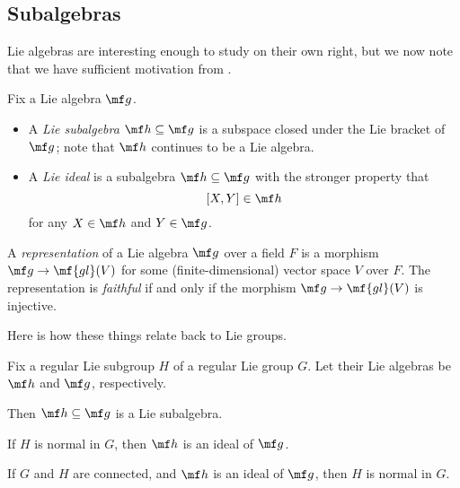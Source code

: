 \documentclass[../notes.tex]{subfiles}
\begin{document}
\subsection{Subalgebras}
Lie algebras are interesting enough to study on their own right, but we now note that we have sufficient motivation from .
\begin{defihelper}  
	Fix a Lie algebra $\mf g$.
	\begin{itemize}
		\item A \textit{Lie subalgebra} $\mf h\subseteq\mf g$ is a subspace closed under the Lie bracket of $\mf g$; note that $\mf h$ continues to be a Lie algebra.
		\item A \textit{Lie ideal} is a subalgebra $\mf h\subseteq\mf g$ with the stronger property that
		\[[X,Y]\in\mf h\]
		for any $X\in\mf h$ and $Y\in\mf g$.
	\end{itemize}
\end{defihelper}
\begin{definition}[representation] 
	A \textit{representation} of a Lie algebra $\mf g$ over a field $F$ is a morphism $\mf g\to\mf{gl}(V)$ for some (finite-dimensional) vector space $V$ over $F$. The representation is \textit{faithful} if and only if the morphism $\mf g\to\mf{gl}(V)$ is injective.
\end{definition}
Here is how these things relate back to Lie groups.
\begin{proposition}
	Fix a regular Lie subgroup $H$ of a regular Lie group $G$. Let their Lie algebras be $\mf h$ and $\mf g$, respectively.
	\begin{listalph}
		\item Then $\mf h\subseteq\mf g$ is a Lie subalgebra.
		\item If $H$ is normal in $G$, then $\mf h$ is an ideal of $\mf g$.
		\item If $G$ and $H$ are connected, and $\mf h$ is an ideal of $\mf g$, then $H$ is normal in $G$.
	\end{listalph}
\end{proposition}
\end{document}
